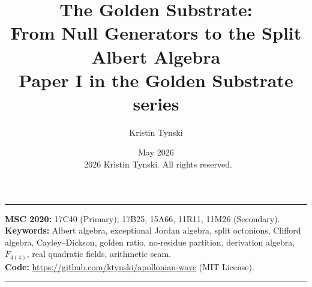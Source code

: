 \documentclass[11pt,a4paper]{article}
\title{The Golden Substrate:\\
From Null Generators to the Split Albert Algebra\\[4pt]
{\large Paper I in the Golden Substrate series}}
\author{Kristin Tynski}
\date{May 2026 \\[6pt] {\small\textcopyright\ 2026 Kristin Tynski. All rights reserved.}}
\theoremstyle{plain}
\theoremstyle{definition}
\theoremstyle{remark}
\numberwithin{equation}{section}
\begin{document}
\thispagestyle{empty}
\maketitle

\vspace{-0.6em}
\begin{center}
{\color{accentMuted}\rule{0.55\textwidth}{0.5pt}}
\end{center}

\begin{center}
\footnotesize
\textbf{MSC 2020:} 17C40 (Primary); 17B25, 15A66, 11R11, 11M26 (Secondary).\\
\textbf{Keywords:} Albert algebra, exceptional Jordan algebra, split
octonions, Clifford algebra, Cayley--Dickson, golden ratio, no-residue
partition, derivation algebra, $F_{4(4)}$, real quadratic fields,
arithmetic seam.\\
\textbf{Code:} \url{https://github.com/ktynski/apollonian-wave}
(MIT License).
\end{center}
\vspace{0.4em}
\begin{center}
{\color{accentMuted}\rule{0.55\textwidth}{0.5pt}}
\end{center}
\vspace{-0.3em}
\end{document}

